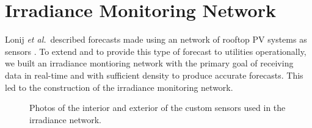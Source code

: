 \documentclass[12pt,letterpaper,notitlepage,openany]{article}
\newcommand*{\etal}{\emph{et al.}~}
\begin{document}
\section{Irradiance Monitoring Network}
Lonij \etal described forecasts made using an network of rooftop PV
systems as sensors \citep{Lonij2013}.
To extend and to provide this type of forecast to utilities
operationally, we built an irradiance montioring network with the
primary goal of receiving data in real-time and with sufficient
density to produce accurate forecasts.
This led to the construction of the irradiance monitoring network.

\begin{figure}[ht]
\centering
\captionsetup[subfigure]{labelformat=empty}
\hspace{0.1em}
\caption{Photos of the interior and exterior of the custom sensors
  used in the irradiance network.}
\label{fig:sensor}
\end{figure}
\end{document}
